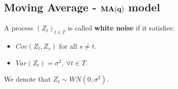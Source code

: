 \subsection{Moving Average - $\bf MA(q)$ model}
\begin{definition}
    A process $(Z_t)_{t\in T}$ is called \textbf{white noise} if it satisfies:
    \begin{itemize}
        \item $Cov(Z_t, Z_s)$ for all $s\ne t$.
        \item $Var(Z_t) = \sigma^2, \ \forall t\in T$.
    \end{itemize}

    \noindent We denote that $Z_t\sim WN(0, \sigma^2)$.
\end{definition}

\begin{definition}[$\bf MA(q)$ model]
    
\end{definition}
